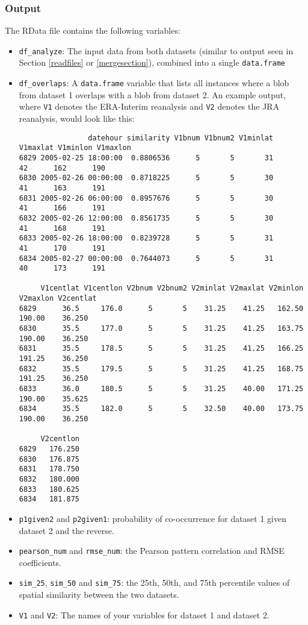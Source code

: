 \documentclass{article}
\begin{document}
\subsubsection{Output}

The RData file contains the following variables:
\begin{itemize}
\item \texttt{df\_analyze}: The input data from both datasets (similar to output seen in Section \ref{readfiles} or \ref{mergesection}), combined into a single \texttt{data.frame}
\item \texttt{df\_overlaps}: A \texttt{data.frame} variable that lists all instances where a blob from dataset 1 overlaps with a blob from dataset 2. An example output, where \texttt{V1} denotes the ERA-Interim reanalysis and \texttt{V2} denotes the JRA reanalysis, would look like this:
\begin{verbatim}
                datehour similarity V1bnum V1bnum2 V1minlat V1maxlat V1minlon V1maxlon
6829 2005-02-25 18:00:00  0.8806536      5       5       31       42      162      190
6830 2005-02-26 00:00:00  0.8718225      5       5       30       41      163      191
6831 2005-02-26 06:00:00  0.8957676      5       5       30       41      166      191
6832 2005-02-26 12:00:00  0.8561735      5       5       30       41      168      191
6833 2005-02-26 18:00:00  0.8239728      5       5       31       41      170      191
6834 2005-02-27 00:00:00  0.7644073      5       5       31       40      173      191

     V1centlat V1centlon V2bnum V2bnum2 V2minlat V2maxlat V2minlon V2maxlon V2centlat
6829      36.5     176.0      5       5    31.25    41.25   162.50   190.00    36.250
6830      35.5     177.0      5       5    31.25    41.25   163.75   190.00    36.250
6831      35.5     178.5      5       5    31.25    41.25   166.25   191.25    36.250
6832      35.5     179.5      5       5    31.25    41.25   168.75   191.25    36.250
6833      36.0     180.5      5       5    31.25    40.00   171.25   190.00    35.625
6834      35.5     182.0      5       5    32.50    40.00   173.75   190.00    36.250

     V2centlon
6829   176.250
6830   176.875
6831   178.750
6832   180.000
6833   180.625
6834   181.875
\end{verbatim}
\item \texttt{p1given2} and \texttt{p2given1}: probability of co-occurrence for dataset 1 given dataset 2 and the reverse.
\item \texttt{pearson\_num} and \texttt{rmse\_num}: the Pearson pattern correlation and RMSE coefficients.
\item \texttt{sim\_25}, \texttt{sim\_50} and \texttt{sim\_75}: the 25th, 50th, and 75th percentile values of spatial similarity between the two datasets.
\item \texttt{V1} and \texttt{V2}: The names of your variables for dataset 1 and dataset 2.

\end{itemize}
\pagebreak
\end{document}

